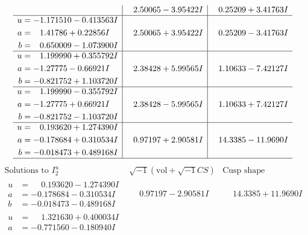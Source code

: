 \documentclass[1p]{elsarticle_modified}
\theoremstyle{definition}
\newcommand{\I}{\sqrt{-1}}
\begin{document}
$$\begin{array}{c|c|c}
 & \phantom{-}2.50065 - 3.95422 I & \phantom{-}0.25209 + 3.41763 I \\ \hline\begin{aligned}
u &= -1.171510 - 0.413563 I \\
a &= \phantom{-}1.41786 + 0.22856 I \\
b &= \phantom{-}0.650009 - 1.073900 I\end{aligned}
 & \phantom{-}2.50065 + 3.95422 I & \phantom{-}0.25209 - 3.41763 I \\ \hline\begin{aligned}
u &= \phantom{-}1.199990 + 0.355792 I \\
a &= -1.27775 - 0.66921 I \\
b &= -0.821752 + 1.103720 I\end{aligned}
 & \phantom{-}2.38428 + 5.99565 I & \phantom{-}1.10633 - 7.42127 I \\ \hline\begin{aligned}
u &= \phantom{-}1.199990 - 0.355792 I \\
a &= -1.27775 + 0.66921 I \\
b &= -0.821752 - 1.103720 I\end{aligned}
 & \phantom{-}2.38428 - 5.99565 I & \phantom{-}1.10633 + 7.42127 I \\ \hline\begin{aligned}
u &= \phantom{-}0.193620 + 1.274390 I \\
a &= -0.178684 + 0.310534 I \\
b &= -0.018473 + 0.489168 I\end{aligned}
 & \phantom{-}0.97197 + 2.90581 I & \phantom{-}14.3385 - 11.9690 I\\
 \hline 
 \end{array}$$\newpage$$\begin{array}{c|c|c}  
\text{Solutions to }I^u_{2}& \I (\text{vol} + \sqrt{-1}CS) & \text{Cusp shape}\\
 \hline 
\begin{aligned}
u &= \phantom{-}0.193620 - 1.274390 I \\
a &= -0.178684 - 0.310534 I \\
b &= -0.018473 - 0.489168 I\end{aligned}
 & \phantom{-}0.97197 - 2.90581 I & \phantom{-}14.3385 + 11.9690 I \\ \hline\begin{aligned}
u &= \phantom{-}1.321630 + 0.400034 I \\
a &= -0.771560 - 0.180940 I \\

\end{aligned}
\end{array}$$
\end{document}
